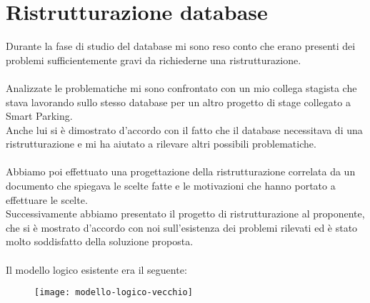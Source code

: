 
\chapter{Ristrutturazione database}
\label{cap:ristrutturazione-database}

Durante la fase di studio del database mi sono reso conto che erano presenti dei problemi sufficientemente gravi 
da richiederne una ristrutturazione.
\\\\
Analizzate le problematiche mi sono confrontato con un mio collega stagista che stava lavorando sullo stesso database per
un altro progetto di stage collegato a Smart Parking.
\\
Anche lui si è dimostrato d'accordo con il fatto che il database necessitava di una ristrutturazione e mi ha aiutato a 
rilevare altri possibili
problematiche.
\\\\
Abbiamo poi effettuato una progettazione della ristrutturazione correlata da un documento che spiegava le scelte fatte
e le motivazioni che hanno portato a effettuare le scelte. 
\\
Successivamente abbiamo presentato il progetto di ristrutturazione al proponente, che si è mostrato d'accordo con
noi sull'esistenza dei problemi rilevati ed è stato molto soddisfatto della soluzione proposta.
\\\\
Il modello logico esistente era il seguente:
\begin{figure}[!h]
  \centering
  \texttt{[image: modello-logico-vecchio]}
\end{figure}

